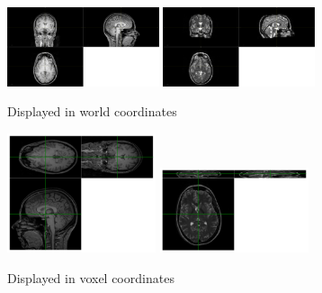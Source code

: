 \documentclass[10pt,twoside]{book}
\begin{document}
\begin{figure}
  \centering
  \begin{subfigure}{\textwidth}
     \centering
     \includegraphics[width=0.49\textwidth]{T1_worldCoordinates}
     \hfill
     \includegraphics[width=0.49\textwidth]{T2_worldCoordinates}
     \caption{Displayed in world coordinates\\[5ex]}
     \label{fig:voxelVsWorldCoordinates_world}
  \end{subfigure}
  \begin{subfigure}{\textwidth}
     \centering
     \includegraphics[width=0.48\textwidth]{T1_voxelCoordinates}
     \hfill
     \includegraphics[width=0.48\textwidth]{T2_voxelCoordinates}
     \caption{Displayed in voxel coordinates}
     \label{fig:voxelVsWorldCoordinates_voxel}
  \end{subfigure}
  \caption{
}
\end{figure}
\end{document}
